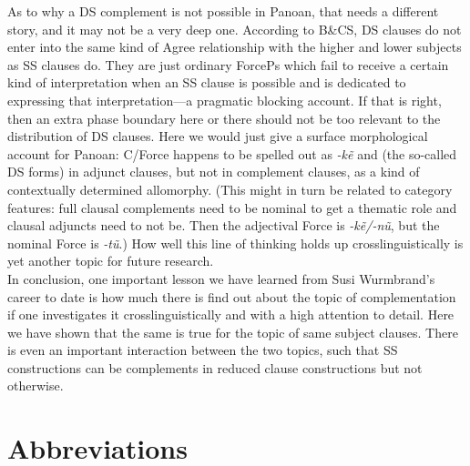 \documentclass[output=paper,colorlinks,citecolor=brown,
]{langscibook}
\renewcommand{\sc}[1]{\textsc{#1}}
\begin{document}
As to why a DS complement is not possible in Panoan, that needs a different story, and it may not be a very deep one. According to B\&CS, DS clauses do not enter into the same kind of Agree relationship with the higher and lower subjects as SS clauses do. They are just ordinary ForcePs which fail to receive a certain kind of interpretation when an SS clause is possible and is dedicated to expressing that interpretation—a pragmatic blocking account. If that is right, then an extra phase boundary here or there should not be too relevant to the distribution of DS clauses. Here we would just give a surface morphological account for Panoan: C/Force happens to be spelled out as \textit{-kẽ} and  (the so-called DS forms) in adjunct clauses, but not in complement clauses, as a kind of contextually determined allomorphy. (This might in turn be related to category features: full clausal complements need to be nominal to get a thematic role and clausal adjuncts need to not be. Then the adjectival Force is \textit{-kẽ/-nũ}, but the nominal Force is \textit{-tũ}.) How well this line of thinking holds up crosslinguistically is yet another topic for future research.\\

In conclusion, one important lesson we have learned from Susi Wurmbrand’s career to date is how much there is find out about the topic of complementation if one investigates it crosslinguistically and with a high attention to detail. Here we have shown that the same is true for the topic of same subject clauses. There is even an important interaction between the two topics, such that SS constructions can be complements in reduced clause constructions but not otherwise.


\section*{Abbreviations}

\end{document}
